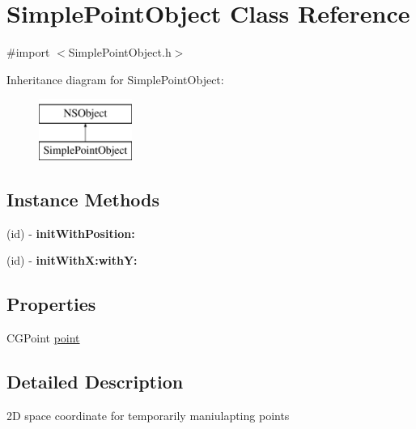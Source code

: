 \hypertarget{interface_simple_point_object}{\section{Simple\-Point\-Object Class Reference}
\label{d8/d8e/interface_simple_point_object}
}


{\ttfamily \#import $<$Simple\-Point\-Object.\-h$>$}

Inheritance diagram for Simple\-Point\-Object\-:\begin{figure}[H]
\begin{center}
\leavevmode
\includegraphics[height=2.000000cm]{d8/d8e/interface_simple_point_object}
\end{center}
\end{figure}
\subsection*{Instance Methods}
\begin{DoxyCompactItemize}
\item 
\hypertarget{interface_simple_point_object_aa5ee92b5c2b007401904a3faefefcd76}{(id) -\/ {\bfseries init\-With\-Position\-:}}\label{d8/d8e/interface_simple_point_object_aa5ee92b5c2b007401904a3faefefcd76}

\item 
\hypertarget{interface_simple_point_object_ac92f127e890c45727110d3d5dd23b2a6}{(id) -\/ {\bfseries init\-With\-X\-:with\-Y\-:}}\label{d8/d8e/interface_simple_point_object_ac92f127e890c45727110d3d5dd23b2a6}

\end{DoxyCompactItemize}
\subsection*{Properties}
\begin{DoxyCompactItemize}
\item 
C\-G\-Point \hyperlink{interface_simple_point_object_a9796a8e6a00e61bb255f59a80aef77d4}{point}
\end{DoxyCompactItemize}


\subsection{Detailed Description}
2\-D space coordinate for temporarily maniulapting points 

